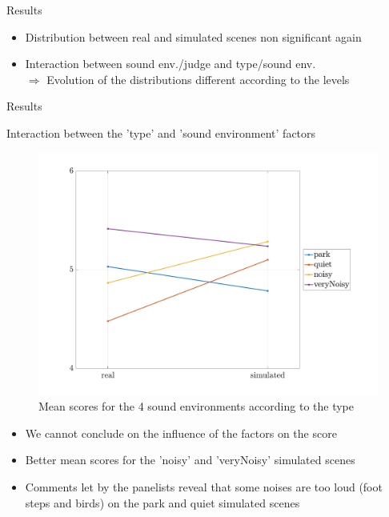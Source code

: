 \documentclass{beamer}
\begin{document}
\begin{frame}{Results}
\begin{itemize}
\footnotesize
	\item Distribution between real and simulated scenes non significant again
	\item Interaction between sound env./judge and type/sound env.\\
	$\Rightarrow$ Evolution of the distributions different according to the levels
\end{itemize}

\end{frame}


\begin{frame}{Results}
\begin{block}{Interaction between the 'type' and 'sound environment' factors}
\begin{minipage}[l]{0.5\linewidth}		
\begin{figure}[hbtp]
\centering
\includegraphics[width=\textwidth]{pictures/testPerceptif_interactionAmbianceCOLOR_EN.pdf}
\caption{Mean scores for the 4 sound environments according to the type}
\end{figure}
\end{minipage}%
\begin{minipage}[c]{0.5\linewidth}
\begin{itemize}
\footnotesize
	\item We cannot conclude on the influence of the factors on the score
	\item Better mean scores for the 'noisy' and 'veryNoisy' simulated scenes
	\item Comments let by the panelists reveal that some noises are too loud (foot steps and birds) on the park and quiet simulated scenes
\end{itemize}

\end{minipage}
\end{block}

\end{frame}
\end{document}
